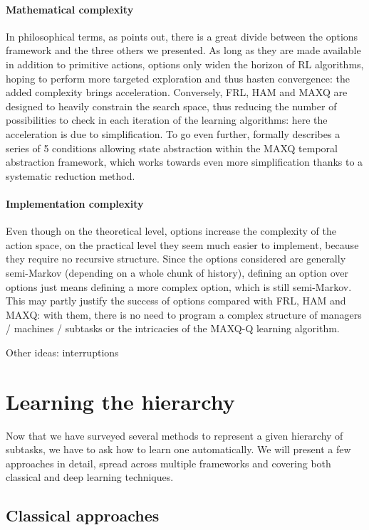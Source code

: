 \documentclass{article}
\begin{document}
\paragraph{Mathematical complexity} In philosophical terms, as \cite{jong_utility_2008} points out, there is a great divide between the options framework and the three others we presented. As long as they are made available in addition to primitive actions, options only widen the horizon of RL algorithms, hoping to perform more targeted exploration and thus hasten convergence: the added complexity brings acceleration. Conversely, FRL, HAM and MAXQ are designed to heavily constrain the search space, thus reducing the number of possibilities to check in each iteration of the learning algorithms: here the acceleration is due to simplification. To go even further, \cite{dietterich_hierarchical_2000} formally describes a series of 5 conditions allowing state abstraction within the MAXQ temporal abstraction framework, which works towards even more simplification thanks to a systematic reduction method.

\paragraph{Implementation complexity} Even though on the theoretical level, options increase the complexity of the action space, on the practical level they seem much easier to implement, because they require no recursive structure. Since the options considered are generally semi-Markov (depending on a whole chunk of history), defining an option over options just means defining a more complex option, which is still semi-Markov. This may partly justify the success of options compared with FRL, HAM and MAXQ: with them, there is no need to program a complex structure of managers / machines / subtasks or the intricacies of the MAXQ-Q learning algorithm.

Other ideas: interruptions

\section{Learning the hierarchy} \label{learning}

Now that we have surveyed several methods to represent a given hierarchy of subtasks, we have to ask how to learn one automatically. We will present a few approaches in detail, spread across multiple frameworks and covering both classical and deep learning techniques.

\subsection{Classical approaches}
\end{document}
